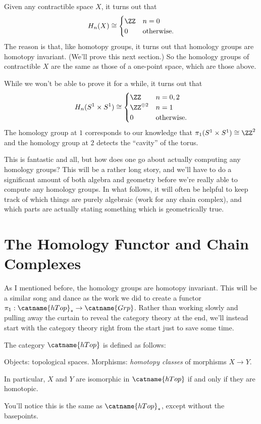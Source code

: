 \begin{example}
	Given any contractible space $X$, it turns out that
	\[
		H_n(X)
		\cong
		\begin{cases}
			\ZZ & n = 0 \\
			0 & \text{otherwise}.
		\end{cases}
	\]
	The reason is that, like homotopy groups, it turns out
	that homology groups are homotopy invariant.
	(We'll prove this next section.)
	So the homology groups of contractible $X$ are the same
	as those of a one-point space, which are those above.
\end{example}

\begin{example}
	While we won't be able to prove it for a while, it turns out that
	\[
		H_n(S^1 \times S^1)
		\cong
		\begin{cases}
			\ZZ & n = 0,2 \\
			\ZZ^{\oplus 2} & n = 1 \\
			0 & \text{otherwise}.
		\end{cases}
	\]
	The homology group at $1$ corresponds to our knowledge that $\pi_1(S^1 \times S^1) \cong \ZZ^2$
	and the homology group at $2$ detects the ``cavity'' of the torus.
\end{example}


This is fantastic and all, but how does one go about actually computing any homology groups?
This will be a rather long story, and we'll have to do a significant amount of both algebra and geometry
before we're really able to compute any homology groups.
In what follows, it will often be helpful to keep track of which things are purely algebraic
(work for any chain complex), and which parts are actually stating something which is geometrically true.

\section{The Homology Functor and Chain Complexes}
As I mentioned before, the homology groups are homotopy invariant.
This will be a similar song and dance as the work we did to
create a functor $\pi_1 : \catname{hTop}_\ast \to \catname{Grp}$.
Rather than working slowly and pulling away the curtain to reveal the category theory at the end,
we'll instead start with the category theory right from the start just to save some time.

\begin{definition}
	The category $\catname{hTop}$ is defined as follows:
	\begin{itemize}
		\ii Objects: topological spaces.
		\ii Morphisms: \emph{homotopy classes} of morphisms $X \to Y$.
	\end{itemize}
	In particular, $X$ and $Y$ are isomorphic in $\catname{hTop}$
	if and only if they are homotopic.
\end{definition}
You'll notice this is the same as $\catname{hTop}_\ast$,
except without the basepoints.

